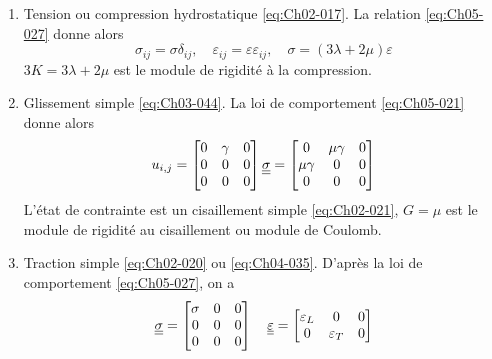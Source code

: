 \begin{enumerate}
    \item Tension ou compression hydrostatique \eqref{eq:Ch02-017}.
        La relation \eqref{eq:Ch05-027} donne alors
        \begin{equation}
            \sigma_{ij} = \sigma \delta_{ij}, \quad \varepsilon_{ij} = \varepsilon \varepsilon_{ij}, \quad \sigma = \left( 3 \lambda + 2 \mu \right) \varepsilon
            \label{eq:Ch05-028}
        \end{equation}
        $3 K = 3 \lambda + 2 \mu$ est le module de rigidité à la compression.
    \item Glissement simple \eqref{eq:Ch03-044}.
        La loi de comportement \eqref{eq:Ch05-021} donne alors 
        \begin{equation}
            u_{i,j} = 
            \begin{bmatrix}
                0 & \gamma & 0 \\
                0 & 0 & 0 \\
                0 & 0 & 0
            \end{bmatrix}
            \underline{\underline{\sigma}} = 
            \begin{bmatrix}
                0 & \mu\gamma & 0 \\
                \mu\gamma & 0 & 0 \\
                0 & 0 & 0
            \end{bmatrix}
            \label{eq:Ch05-029}
        \end{equation}
        L'état de contrainte est un cisaillement simple \eqref{eq:Ch02-021}, $G=\mu$ est le module de rigidité au cisaillement ou module de Coulomb.
    \item Traction simple \eqref{eq:Ch02-020} ou \eqref{eq:Ch04-035}.
        D'après la loi de comportement \eqref{eq:Ch05-027}, on a 
        \begin{equation}
            \underline{\underline{\sigma}} = 
            \begin{bmatrix}
                \sigma & 0 & 0 \\
                0 & 0 & 0 \\
                0 & 0 & 0
            \end{bmatrix}
            \quad
            \underline{\underline{\varepsilon}} = 
            \begin{bmatrix}
                \varepsilon_L & 0 & 0 \\
                0 & \varepsilon_T & 0 \\

\end{bmatrix}
\end{equation}
\end{enumerate}
